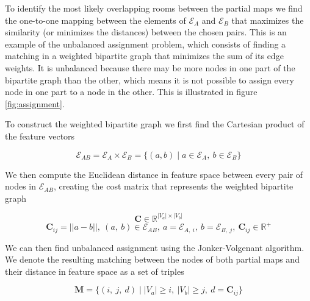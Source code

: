 To identify the most likely overlapping rooms between the partial maps we find the one-to-one mapping between the elements of \(\mathcal{E}_A\) and \(\mathcal{E}_B\) that maximizes the similarity (or minimizes the distances) between the chosen pairs. This is an example of the unbalanced assignment problem, which consists of finding a matching in a weighted bipartite graph that minimizes the sum of its edge weights. It is unbalanced because there may be more nodes in one part of the bipartite graph than the other, which means it is not possible to assign every node in one part to a node in the other. This is illustrated in figure \ref{fig:assignment}.



To construct the weighted bipartite graph we first find the Cartesian product of the feature vectors 

\begin{equation}
    \label{eq:E_ab}
    \mathcal{E}_{AB} = \mathcal{E}_A \times \mathcal{E}_B = \{(a,b) \mid a \in \mathcal{E}_A,\ b \in \mathcal{E}_B\}
\end{equation}

We then compute the Euclidean distance in feature space between every pair of nodes in \(\mathcal{E}_{AB}\), creating the cost matrix that represents the weighted bipartite graph 

\begin{equation}
    \label{eq:C}
    \mathbf{C} \in \mathbb{R}^{|V_a| \times |V_b|}
\end{equation}
\begin{equation}
    \label{eq:C}
    \mathbf{C}_{ij} = ||a - b||,\ (a,\ b) \in \mathcal{E}_{AB},\ a = \mathcal{E}_{A,\ i},\ b = \mathcal{E}_{B,\ j},\ \mathbf{C}_{ij} \in \mathbb{R}^+
\end{equation}

We can then find unbalanced assignment using the Jonker-Volgenant algorithm. We denote the resulting matching between the nodes of both partial maps and their distance in feature space as a set of triples 

\begin{equation}
    \label{eq:M}
    \mathbf{M} = \{(i,\ j,\ d) \mid  |V_a| \geq i,\ |V_b|\geq j,\ d = \mathbf{C}_{ij}\}
\end{equation}

